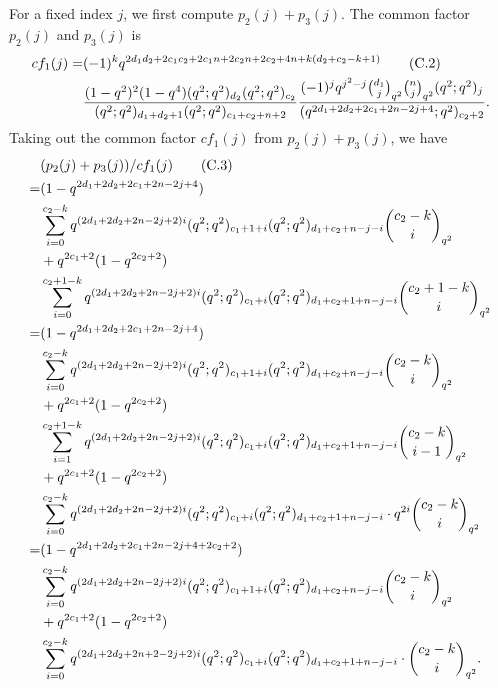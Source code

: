 \documentclass[table,a4paper,reqno]{amsart}
\numberwithin{equation}{section}
\theoremstyle{definition}
\begin{document}
For a fixed index $j$, we first compute $p_2(j)+p_3(j)$. The common factor $p_2(j)$ and $p_3(j)$ is 
\begin{align}\stepcounter{equation}
        cf_1(j)=&(-1)^kq^{2d_1d_2+2c_1c_2+2c_1n+2c_2n+2c_2+4n+k(d_2+c_2-k+1)}\tag{C.2}\\
        &\frac{(1-q^2)^2(1-q^4)(q^2;q^2)_{d_2}(q^2;q^2)_{c_2}}{(q^2;q^2)_{d_1+d_2+1}(q^2;q^2)_{c_1+c_2+n+2}}\frac{(-1)^{j}q^{j^2-j}{d_1\choose j}_{q^{2}}{n\choose j}_{q^2}(q^2;q^2)_{j}}{(q^{2d_1+2d_2+2c_1+2n-2j+4};q^2)_{c_2+2}}.\notag
\end{align}
Taking out the common factor $cf_1(j)$ from $p_2(j)+p_3(j)$, we have
\begin{align}\label{eq:b.3}\stepcounter{equation}
        &(p_2(j)+p_3(j))/cf_1(j)\tag{C.3}\\
        =&(1-q^{2d_1+2d_2+2c_1+2n-2j+4})\notag\\
        &\sum_{i=0}^{c_2-k}q^{(2d_1+2d_2+2n-2j+2)i}(q^2;q^2)_{c_1+1+i}(q^2;q^2)_{d_1+c_2+n-j-i}{c_2-k\choose i}_{q^2}\notag\\
        &+q^{2c_1+2}(1-q^{2c_2+2})\notag\\
        &\sum_{i=0}^{c_2+1-k}q^{(2d_1+2d_2+2n-2j+2)i}(q^2;q^2)_{c_1+i}(q^2;q^2)_{d_1+c_2+1+n-j-i}{c_2+1-k\choose i}_{q^2}\notag\\
        =&(1-q^{2d_1+2d_2+2c_1+2n-2j+4})\notag\\
        &\sum_{i=0}^{c_2-k}q^{(2d_1+2d_2+2n-2j+2)i}(q^2;q^2)_{c_1+1+i}(q^2;q^2)_{d_1+c_2+n-j-i}{c_2-k\choose i}_{q^2}\notag\\
        &+q^{2c_1+2}(1-q^{2c_2+2})\notag\\
        &\sum_{i=1}^{c_2+1-k}q^{(2d_1+2d_2+2n-2j+2)i}(q^2;q^2)_{c_1+i}(q^2;q^2)_{d_1+c_2+1+n-j-i}{c_2-k\choose i-1}_{q^2}\notag\\
        &+q^{2c_1+2}(1-q^{2c_2+2})\notag\\
        &\sum_{i=0}^{c_2-k}q^{(2d_1+2d_2+2n-2j+2)i}(q^2;q^2)_{c_1+i}(q^2;q^2)_{d_1+c_2+1+n-j-i}\cdot q^{2i}{c_2-k\choose i}_{q^2}\notag\\
        =&(1-q^{2d_1+2d_2+2c_1+2n-2j+4+2c_2+2})\notag\\
        &\sum_{i=0}^{c_2-k}q^{(2d_1+2d_2+2n-2j+2)i}(q^2;q^2)_{c_1+1+i}(q^2;q^2)_{d_1+c_2+n-j-i}{c_2-k\choose i}_{q^2}\notag\\
        &+q^{2c_1+2}(1-q^{2c_2+2})\notag\\
        &\sum_{i=0}^{c_2-k}q^{(2d_1+2d_2+2n+2-2j+2)i}(q^2;q^2)_{c_1+i}(q^2;q^2)_{d_1+c_2+1+n-j-i}\cdot {c_2-k\choose i}_{q^2}.\notag
\end{align}
\end{document}
